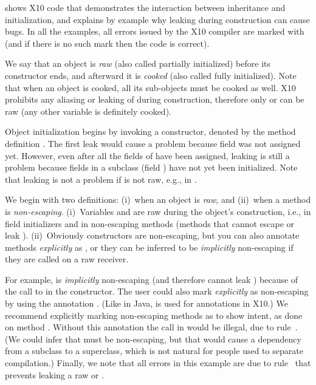  shows X10 code that demonstrates the interaction
    between inheritance and initialization,
    and explains by example why leaking \this during construction can cause bugs.
In all the examples, all errors issued by the X10 compiler are marked with 
    (and if there is no such mark then the code is correct).

We say that an object is \emph{raw} (also called partially initialized) before its constructor ends,
    and afterward it is \emph{cooked} (also called fully initialized).
Note that when an object is cooked, all its sub-objects must be cooked as well.
X10 prohibits any aliasing or leaking of \this during construction,
    therefore only \this or  can be raw (any other variable is definitely cooked).

Object initialization begins by invoking a constructor,
    denoted by the method definition .
The first leak would cause a problem because field  was not assigned yet.
However, even after all the fields of  have been assigned,
    leaking is still a problem
    because fields in a subclass (field ) have not yet been initialized.
Note that leaking is not a problem if \this is not raw, e.g., in .

We begin with two definitions:
    (i)~when an object is \emph{raw}, and
    (ii)~when a method is \emph{non-escaping}.
(i)~Variables \this and  are raw
    during the object's construction,
    i.e., in field initializers and in {non-escaping} methods
    (methods that cannot escape or leak \this).
(ii)~Obviously constructors are non-escaping,
    but you can also annotate methods \emph{explicitly} as ,
    or they can be inferred to be \emph{implicitly} non-escaping
    if they are called on a raw \this receiver.

For example,  is \emph{implicitly} non-escaping (and therefore cannot leak \this)
    because of the call to 
    in the constructor.
The user could also mark  \emph{explicitly} as non-escaping by using the annotation
    .
(Like in Java,  is used for annotations in X10.)
We recommend explicitly marking non-escaping methods as  to show intent,
    as done on method .
Without this annotation the call  in  would be illegal,
    due to rule~.
(We could infer that  must be non-escaping,
    but that would cause a dependency from a subclass to a superclass,
    which is not natural for people used to separate compilation.)
Finally, we note that all errors in this example are due to rule~
    that prevents leaking a raw \this or .



